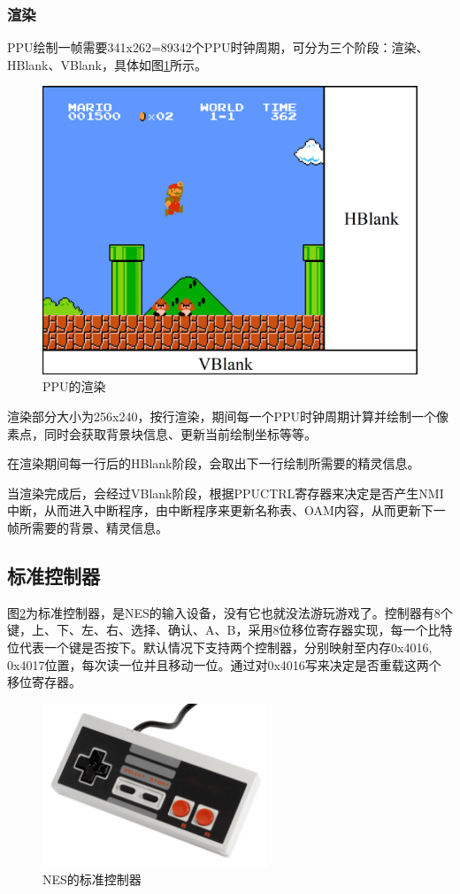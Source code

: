 \documentclass[a4paper]{ltxdoc}
\begin{document}
{\subsubsection{渲染}
PPU绘制一帧需要341x262=89342个PPU时钟周期，可分为三个阶段：渲染、HBlank、VBlank，具体如图\ref{fig:rendering}所示。
\begin{figure}[h]
	\centering
	\includegraphics[width=\textwidth]{images/vblank_hblank.png}
	\caption{PPU的渲染}
	\label{fig:rendering}
\end{figure}

渲染部分大小为256x240，按行渲染，期间每一个PPU时钟周期计算并绘制一个像素点，同时会获取背景块信息、更新当前绘制坐标等等\cite{ppurendering}。

在渲染期间每一行后的HBlank阶段，会取出下一行绘制所需要的精灵信息。\cite{evalsprite}

当渲染完成后，会经过VBlank阶段，根据PPUCTRL寄存器来决定是否产生NMI中断，从而进入中断程序，由中断程序来更新名称表、OAM内容，从而更新下一帧所需要的背景、精灵信息。

\subsection{标准控制器}
图\ref{fig:pad}为标准控制器，是NES的输入设备，没有它也就没法游玩游戏了。控制器有8个键，上、下、左、右、选择、确认、A、B，采用8位移位寄存器实现，每一个比特位代表一个键是否按下。默认情况下支持两个控制器，分别映射至内存0x4016, 0x4017位置，每次读一位并且移动一位。通过对0x4016写来决定是否重载这两个移位寄存器。

\begin{figure}[h]
	\centering
	\includegraphics[width=0.6\textwidth]{images/pad.jpg}
	\caption{NES的标准控制器}
	\label{fig:pad}
\end{figure}

}
\end{document}
